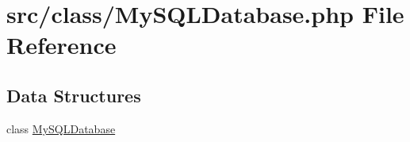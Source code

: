 \hypertarget{_my_s_q_l_database_8php}{}\section{src/class/\+My\+S\+Q\+L\+Database.php File Reference}
\label{_my_s_q_l_database_8php}
\subsection*{Data Structures}
\begin{DoxyCompactItemize}
\item 
class \hyperlink{class_my_s_q_l_database}{My\+S\+Q\+L\+Database}
\end{DoxyCompactItemize}
